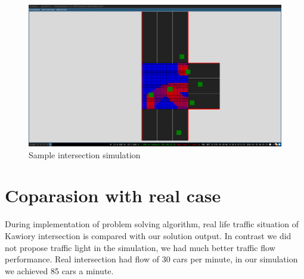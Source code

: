 \documentclass[12pt]{extreport}
\begin{document}
\begin{figure}
	\begin{center}
		\includegraphics[width=\linewidth]{screnshot}
	\end{center} 
	\caption{Sample intersection simulation}
\end{figure}

  


\chapter{Coparasion with real case}
During implementation of problem solving algorithm, real life traffic situation of Kawiory intersection is compared with our solution output. In contrast we did not propose traffic light in the simulation, we had much better traffic flow performance. Real intersection had flow of 30 cars per minute, in our simulation we achieved 85 cars a minute.
\end{document}
